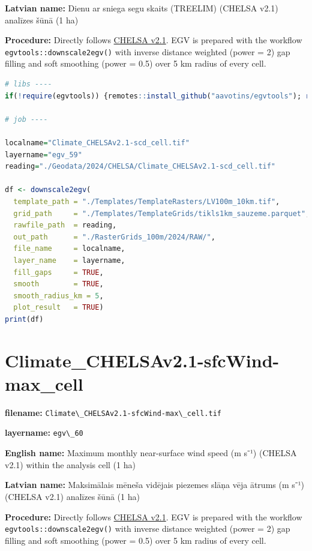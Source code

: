 \documentclass[
]{book}
\newcommand{\passthrough}[1]{#1}
\begin{document}
\textbf{Latvian name:} Dienu ar sniega segu skaits (TREELIM) (CHELSA v2.1) analīzes šūnā (1 ha)

\textbf{Procedure:} Directly follows \hyperref[Ch04.11]{CHELSA v2.1}. EGV is prepared with the
workflow \passthrough{\lstinline!egvtools::downscale2egv()!} with inverse distance weighted (power = 2)
gap filling and soft smoothing (power = 0.5) over 5 km radius of every cell.

\begin{lstlisting}[language=R]
# libs ----
if(!require(egvtools)) {remotes::install_github("aavotins/egvtools"); require(egvtools)}

# job ----

localname="Climate_CHELSAv2.1-scd_cell.tif"
layername="egv_59"
reading="./Geodata/2024/CHELSA/Climate_CHELSAv2.1-scd_cell.tif"

df <- downscale2egv(
  template_path = "./Templates/TemplateRasters/LV100m_10km.tif",
  grid_path     = "./Templates/TemplateGrids/tikls1km_sauzeme.parquet",
  rawfile_path  = reading,
  out_path      = "./RasterGrids_100m/2024/RAW/",
  file_name     = localname,
  layer_name    = layername,
  fill_gaps     = TRUE,
  smooth        = TRUE,
  smooth_radius_km = 5,
  plot_result   = TRUE)
print(df)
\end{lstlisting}

\section{Climate\_CHELSAv2.1-sfcWind-max\_cell}\label{ch06.060}

\textbf{filename:} \passthrough{\lstinline!Climate\_CHELSAv2.1-sfcWind-max\_cell.tif!}

\textbf{layername:} \passthrough{\lstinline!egv\_60!}

\textbf{English name:} Maximum monthly near-surface wind speed (m s⁻¹) (CHELSA v2.1) within the analysis cell (1 ha)

\textbf{Latvian name:} Maksimālais mēneša vidējais piezemes slāņa vēja ātrums (m s⁻¹) (CHELSA v2.1) analīzes šūnā (1 ha)

\textbf{Procedure:} Directly follows \hyperref[Ch04.11]{CHELSA v2.1}. EGV is prepared with the
workflow \passthrough{\lstinline!egvtools::downscale2egv()!} with inverse distance weighted (power = 2)
gap filling and soft smoothing (power = 0.5) over 5 km radius of every cell.
\end{document}
